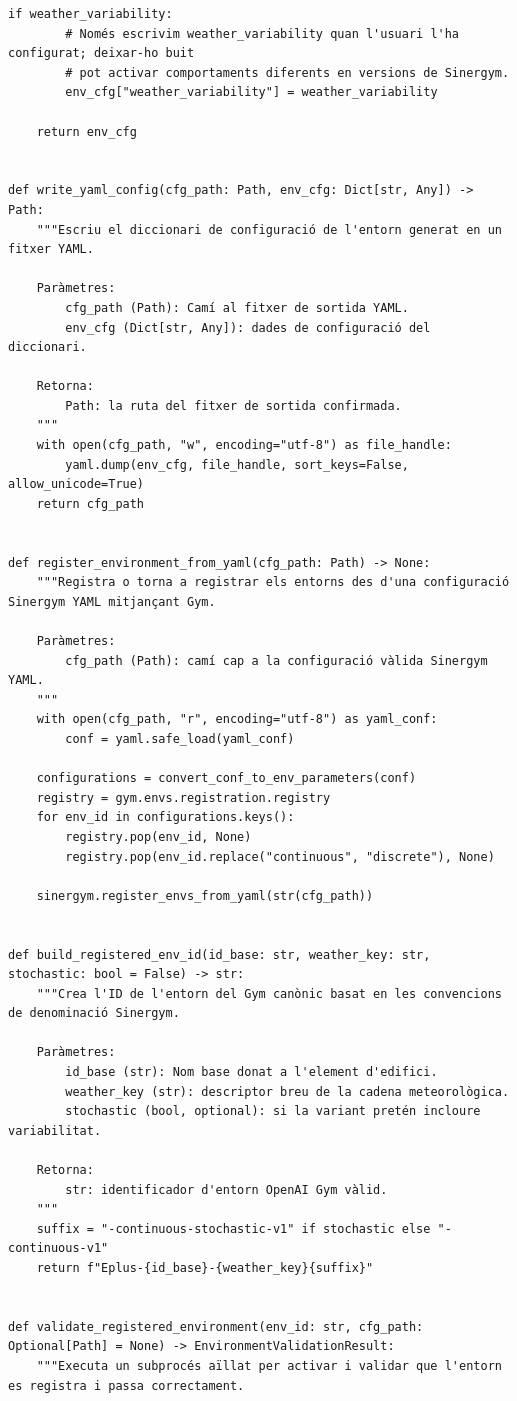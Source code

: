 \documentclass[10pt,a4paper]{article}
\begin{document}
\begin{lstlisting}[style=studioPython,caption={backend/afegir\_entorn\_config.py},label={lst:backend-afegir-entorn-config-py}]
    if weather_variability:
        # Només escrivim weather_variability quan l'usuari l'ha configurat; deixar-ho buit
        # pot activar comportaments diferents en versions de Sinergym.
        env_cfg["weather_variability"] = weather_variability

    return env_cfg


def write_yaml_config(cfg_path: Path, env_cfg: Dict[str, Any]) -> Path:
    """Escriu el diccionari de configuració de l'entorn generat en un fitxer YAML.

    Paràmetres:
        cfg_path (Path): Camí al fitxer de sortida YAML.
        env_cfg (Dict[str, Any]): dades de configuració del diccionari.

    Retorna:
        Path: la ruta del fitxer de sortida confirmada.
    """
    with open(cfg_path, "w", encoding="utf-8") as file_handle:
        yaml.dump(env_cfg, file_handle, sort_keys=False, allow_unicode=True)
    return cfg_path


def register_environment_from_yaml(cfg_path: Path) -> None:
    """Registra o torna a registrar els entorns des d'una configuració Sinergym YAML mitjançant Gym.

    Paràmetres:
        cfg_path (Path): camí cap a la configuració vàlida Sinergym YAML.
    """
    with open(cfg_path, "r", encoding="utf-8") as yaml_conf:
        conf = yaml.safe_load(yaml_conf)

    configurations = convert_conf_to_env_parameters(conf)
    registry = gym.envs.registration.registry
    for env_id in configurations.keys():
        registry.pop(env_id, None)
        registry.pop(env_id.replace("continuous", "discrete"), None)

    sinergym.register_envs_from_yaml(str(cfg_path))


def build_registered_env_id(id_base: str, weather_key: str, stochastic: bool = False) -> str:
    """Crea l'ID de l'entorn del Gym canònic basat en les convencions de denominació Sinergym.

    Paràmetres:
        id_base (str): Nom base donat a l'element d'edifici.
        weather_key (str): descriptor breu de la cadena meteorològica.
        stochastic (bool, optional): si la variant pretén incloure variabilitat.

    Retorna:
        str: identificador d'entorn OpenAI Gym vàlid.
    """
    suffix = "-continuous-stochastic-v1" if stochastic else "-continuous-v1"
    return f"Eplus-{id_base}-{weather_key}{suffix}"


def validate_registered_environment(env_id: str, cfg_path: Optional[Path] = None) -> EnvironmentValidationResult:
    """Executa un subprocés aïllat per activar i validar que l'entorn es registra i passa correctament.


\end{lstlisting}
\end{document}
